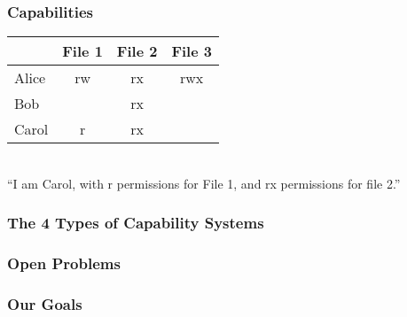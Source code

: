 \documentclass[xcolor=table]{beamer}
\begin{document}
\begin{frame}
  \frametitle{Capabilities}
  \begin{center}
    \begin{tabular}{|l||c|c|c|}
      \hline
      &File 1&File 2&File 3\\
      \hline
      \hline
      Alice&rw&rx&rwx\\
      \hline
      Bob&&rx&\\
      \hline
      \cellcolor{green}Carol&\cellcolor{green}r&\cellcolor{green}rx&\cellcolor{green}\\
      \hline
    \end{tabular}\\
    \vspace{10pt}
    ``I am Carol, with r permissions for File 1, and rx permissions for file 2.''
  \end{center}
\end{frame}

\begin{frame}
  \frametitle{The 4 Types of Capability Systems}
\end{frame}

\begin{frame}
  \frametitle{Open Problems}
\end{frame}

\begin{frame}
  \frametitle{Our Goals}
\end{frame}
\end{document}
